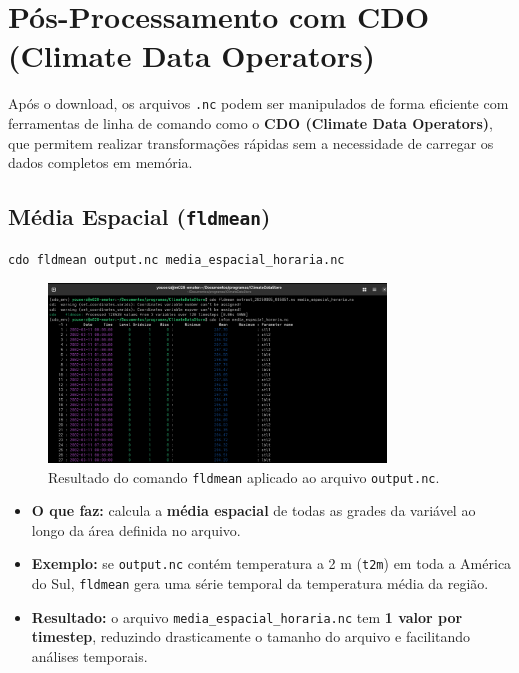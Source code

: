 \documentclass[12pt, a4paper]{article}
\begin{document}
\section{Pós-Processamento com CDO (Climate Data Operators)}

Após o download, os arquivos \texttt{.nc} podem ser manipulados de forma eficiente com ferramentas de linha de comando como o \textbf{CDO (Climate Data Operators)}, que permitem realizar transformações rápidas sem a necessidade de carregar os dados completos em memória.

\subsection{Média Espacial (\texttt{fldmean})}

\begin{lstlisting}[language=bash]
cdo fldmean output.nc media_espacial_horaria.nc
\end{lstlisting}

\begin{figure}[h!]
    \centering
    \includegraphics[width=0.8\textwidth]{1.png}
    \caption{Resultado do comando \texttt{fldmean} aplicado ao arquivo \texttt{output.nc}.}
    \label{fig:fldmean}
\end{figure}

\begin{itemize}
    \item \textbf{O que faz:} calcula a \textbf{média espacial} de todas as grades da variável ao longo da área definida no arquivo.
    \item \textbf{Exemplo:} se \texttt{output.nc} contém temperatura a 2 m (\texttt{t2m}) em toda a América do Sul, \texttt{fldmean} gera uma série temporal da temperatura média da região.
    \item \textbf{Resultado:} o arquivo \texttt{media\_espacial\_horaria.nc} tem \textbf{1 valor por timestep}, reduzindo drasticamente o tamanho do arquivo e facilitando análises temporais.
\end{itemize}
\end{document}
